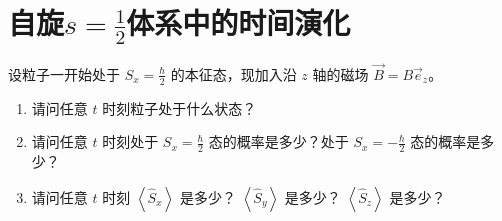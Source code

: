 \documentclass[lang=cn,10pt]{elegantbook}
\begin{document}
\section{自旋\texorpdfstring{$s=\frac{1}{2}$}{s=1/2}体系中的时间演化}
\begin{example}
	设粒子一开始处于 $S_x = \frac{\hbar}{2}$ 的本征态，现加入沿 $z$ 轴的磁场 $\vec{B} = B \vec{e}_z$。
	
	\begin{enumerate}
		\item 请问任意 $t$ 时刻粒子处于什么状态？
		\item 请问任意 $t$ 时刻处于 $S_x = \frac{\hbar}{2}$ 态的概率是多少？处于 $S_x = -\frac{\hbar}{2}$ 态的概率是多少？
		\item 请问任意 $t$ 时刻 $\left\langle \hat{S}_x \right\rangle$ 是多少？ $\left\langle \hat{S}_y \right\rangle$ 是多少？ $\left\langle \hat{S}_z \right\rangle$ 是多少？
	\end{enumerate}
\end{example}
\end{document}

